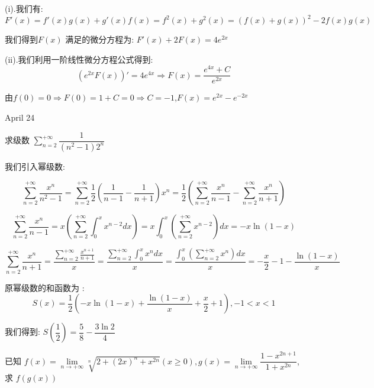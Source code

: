 \begin{solution}
	
	(i).我们有: 
	$$F'(x)=f'(x)g(x)+g'(x)f(x)=f^2(x)+g^2(x)=(f(x)+g(x))^2-2f(x)g(x)$$
	
	我们得到$F(x)$ 满足的微分方程为: $F'(x)+2F(x)=4e^{2x}$
	
	(ii).我们利用一阶线性微分方程公式得到: 
	$$(e^{2x}F(x))'=4e^{4x}\Rightarrow F(x)=\frac{e^{4x}+C}{e^{2x}}$$
	
	由$f(0)=0\Rightarrow F(0)=1+C=0\Rightarrow C=-1$,$F(x)=e^{2x}-e^{-2x}$
\end{solution}


\textcolor{purplea}{April 24}

\begin{example}[][Exam: 30.4.5]
	求级数 $\sum\limits_{n=2}^{+\infty}\dfrac{1}{(n^2-1)2^n}$
\end{example}

\begin{solution}
	
	我们引入幂级数: 
	
	$$\sum\limits_{n=2}^{+\infty}\frac{x^n}{n^2-1}=\sum\limits_{n=2}^{+\infty}\frac{1}{2}(\frac{1}{n-1}-\frac{1}{n+1})x^n=\frac{1}{2}(\sum\limits_{n=2}^{+\infty}\frac{x^n}{n-1}-\sum\limits_{n=2}^{+\infty}\frac{x^n}{n+1})$$
	
	$$\sum\limits_{n=2}^{+\infty}\frac{x^n}{n-1}=x(\sum\limits_{n=2}^{+\infty}\int_{0}^{x}x^{n-2}dx)=x\int_{0}^{x}(\sum\limits_{n=2}^{+\infty}x^{n-2})dx=-x\ln(1-x)$$
	
	$$\sum\limits_{n=2}^{+\infty}\frac{x^n}{n+1}=\frac{\sum\limits_{n=2}^{+\infty}\frac{x^{n+1}}{n+1}}{x}=\frac{\sum\limits_{n=2}^{+\infty}\int_{0}^{x}x^ndx}{x}=\frac{\int_{0}^{x}(\sum\limits_{n=2}^{+\infty}x^n)dx}{x}=-\frac{x}{2}-1-\frac{\ln(1-x)}{x}$$
	
	原幂级数的和函数为 : 
	$$S(x)=\frac{1}{2}(-x\ln(1-x)+\frac{\ln(1-x)}{x}+\frac{x}{2}+1),-1<x<1$$
	
	我们得到: $S(\dfrac{1}{2})=\dfrac{5}{8}-\dfrac{3\ln 2}{4}$
\end{solution}

\begin{example}[][Exam: 30.4.6]
	已知 $f(x)=\lim\limits_{n\to +\infty}\sqrt[n]{2+(2x)^{n}+x^{2n}}(x\geq 0), g(x)=\lim\limits_{n\to +\infty}\dfrac{1-x^{2n+1}}{1+x^{2n}}$, 求 $f(g(x))$
\end{example}

